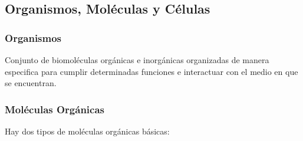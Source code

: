   \subsection{Organismos, Mol\'eculas y C\'elulas}
  \subsubsection{Organismos}
  Conjunto de biomol\'eculas org\'anicas e inorg\'anicas organizadas de manera especifica para cumplir determinadas funciones e interactuar con el medio en que se encuentran.
  
  \subsubsection{Mol\'eculas  Org\'anicas}
  Hay dos tipos de mol\'eculas org\'anicas b\'asicas:

